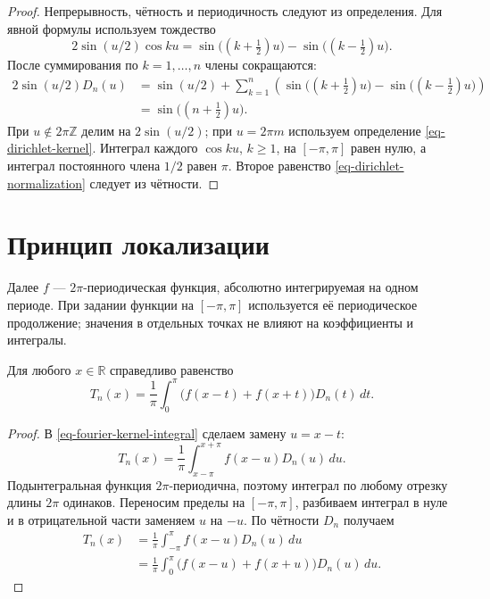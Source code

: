 \begin{proof}

Непрерывность, чётность и периодичность следуют из определения. Для явной формулы используем тождество
\[
2\sin(u/2)\cos ku
=\sin\bigl((k+\tfrac12)u\bigr)-\sin\bigl((k-\tfrac12)u\bigr).
\]
После суммирования по \(k=1,\ldots,n\) члены сокращаются:
\[
\begin{aligned}
2\sin(u/2)D_n(u)
&=\sin(u/2)+\sum_{k=1}^n
\left(\sin\bigl((k+\tfrac12)u\bigr)-\sin\bigl((k-\tfrac12)u\bigr)\right)\\
&=\sin\bigl((n+\tfrac12)u\bigr).
\end{aligned}
\]
При \(u\notin2\pi\mathbb Z\) делим на \(2\sin(u/2)\); при \(u=2\pi m\) используем определение \eqref{eq-dirichlet-kernel}. Интеграл каждого \(\cos ku\), \(k\ge1\), на \([-\pi,\pi]\) равен нулю, а интеграл постоянного члена \(1/2\) равен \(\pi\). Второе равенство \eqref{eq-dirichlet-normalization} следует из чётности.

\end{proof}

\section{Принцип локализации}\label{sec-fourier-localization}

Далее \(f\) --- \(2\pi\)-периодическая функция, абсолютно интегрируемая на одном периоде. При задании функции на \([-\pi,\pi]\) используется её периодическое продолжение; значения в отдельных точках не влияют на коэффициенты и интегралы.

\begin{lemma}\label{lem-fourier-symmetric-integral}

Для любого \(x\in\mathbb R\) справедливо равенство
\begin{equation}
T_n(x)=\frac1\pi\int_0^\pi\bigl(f(x-t)+f(x+t)\bigr)D_n(t)\,dt.
\label{eq-fourier-symmetric-integral}
\end{equation}

\end{lemma}

\begin{proof}

В \eqref{eq-fourier-kernel-integral} сделаем замену \(u=x-t\):
\[
T_n(x)=\frac1\pi\int_{x-\pi}^{x+\pi}f(x-u)D_n(u)\,du.
\]
Подынтегральная функция \(2\pi\)-периодична, поэтому интеграл по любому отрезку длины \(2\pi\) одинаков. Переносим пределы на \([-\pi,\pi]\), разбиваем интеграл в нуле и в отрицательной части заменяем \(u\) на \(-u\). По чётности \(D_n\) получаем
\[
\begin{aligned}
T_n(x)&=\frac1\pi\int_{-\pi}^{\pi}f(x-u)D_n(u)\,du\\
&=\frac1\pi\int_0^\pi\bigl(f(x-u)+f(x+u)\bigr)D_n(u)\,du.
\end{aligned}
\]

\end{proof}

